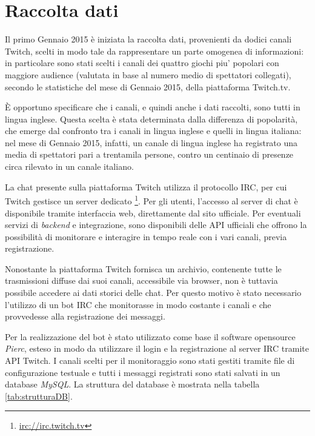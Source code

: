 \documentclass[a4paper,12pt,openright,twoside]{report}
\theoremstyle{definition}
\begin{document}
\section{Raccolta dati}
Il primo Gennaio 2015 è iniziata la raccolta dati, provenienti da dodici canali 
Twitch, scelti in modo tale da rappresentare un parte omogenea di informazioni: in particolare sono stati scelti 
i canali dei quattro giochi piu' popolari con maggiore audience 
(valutata in base al numero medio di spettatori collegati), 
secondo le statistiche del mese di Gennaio 2015, della piattaforma Twitch.tv.

È opportuno specificare che i canali, e quindi anche i dati raccolti, 
sono tutti in lingua inglese. Questa scelta è stata determinata dalla 
differenza di popolarità, che emerge dal confronto tra i canali in lingua 
inglese e quelli in lingua italiana:
nel mese di Gennaio 2015, infatti, un canale di lingua inglese ha registrato una 
media di spettatori pari a trentamila persone, 
contro un centinaio di presenze circa rilevato in un canale italiano.

La chat presente sulla piattaforma Twitch utilizza il protocollo IRC, 
per cui Twitch gestisce un server dedicato \footnote{\url{irc://irc.twitch.tv}}. 
Per gli utenti, l’accesso al server di chat è disponibile tramite interfaccia web, 
direttamente dal sito ufficiale. Per eventuali servizi di \emph{backend}
e integrazione, sono disponibili 
delle API ufficiali che offrono la possibilità di monitorare e interagire in tempo reale 
con i vari canali, previa registrazione.

Nonostante la piattaforma Twitch fornisca un archivio, contenente tutte le trasmissioni diffuse dai suoi canali, 
accessibile via browser, non è tuttavia possibile accedere ai dati storici delle chat.
Per questo motivo è stato necessario l’utilizzo di un bot IRC che monitorasse in 
modo costante i canali e che provvedesse alla registrazione dei messaggi.

Per la realizzazione del bot è stato utilizzato come base il software opensource \emph{Pierc},
esteso in modo da utilizzare il login e la registrazione 
al server IRC tramite API Twitch. I canali scelti per il monitoraggio sono stati 
gestiti tramite file di configurazione testuale e tutti i messaggi registrati sono stati salvati 
in un database \emph{MySQL}. La struttura del database è mostrata nella tabella \ref{tab:strutturaDB}.
\end{document}
